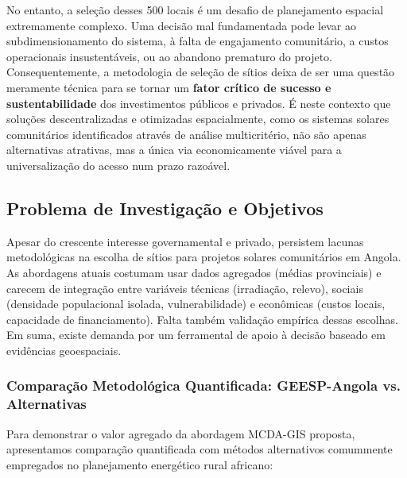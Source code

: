 \documentclass[12pt, a4paper]{article}
\begin{document}
No entanto, a seleção desses 500 locais é um desafio de planejamento espacial extremamente complexo. Uma decisão mal fundamentada pode levar ao subdimensionamento do sistema, à falta de engajamento comunitário, a custos operacionais insustentáveis, ou ao abandono prematuro do projeto. Consequentemente, a metodologia de seleção de sítios deixa de ser uma questão meramente técnica para se tornar um \textbf{fator crítico de sucesso e sustentabilidade} dos investimentos públicos e privados. É neste contexto que soluções descentralizadas e otimizadas espacialmente, como os sistemas solares comunitários identificados através de análise multicritério, não são apenas alternativas atrativas, mas a única via economicamente viável para a universalização do acesso num prazo razoável.

\subsection{Problema de Investigação e Objetivos}

Apesar do crescente interesse governamental e privado, persistem lacunas metodológicas na escolha de sítios para projetos solares comunitários em Angola. As abordagens atuais costumam usar dados agregados (médias provinciais) e carecem de integração entre variáveis técnicas (irradiação, relevo), sociais (densidade populacional isolada, vulnerabilidade) e econômicas (custos locais, capacidade de financiamento). Falta também validação empírica dessas escolhas. Em suma, existe demanda por um ferramental de apoio à decisão baseado em evidências geoespaciais.

\subsubsection{Comparação Metodológica Quantificada: GEESP-Angola vs. Alternativas}

Para demonstrar o valor agregado da abordagem MCDA-GIS proposta, apresentamos comparação quantificada com métodos alternativos comummente empregados no planejamento energético rural africano:
\end{document}
